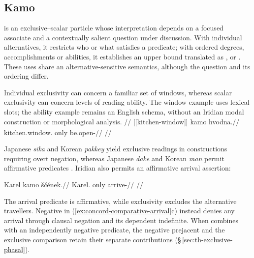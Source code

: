 \subsection{Kamo}  is an exclusive--scalar particle whose
interpretation depends on a focused associate and a contextually salient
question under discussion. With individual alternatives, it restricts who or
what satisfies a predicate; with ordered degrees, accomplishments or abilities,
it establishes an upper bound translated as ,  or
. These uses share an alternative-sensitive semantics, although
the question and its ordering differ.

Individual exclusivity can concern a familiar set of windows, whereas
scalar exclusivity can concern levels of reading ability. The window
example uses lexical slots; the ability example remains an English schema,
without an Iridian modal construction or morphological analysis.
\pex\label{ex:kamo-household-alternatives}
\a
\begingl
\glpreamble {}//
\gla \textnormal{[[kitchen-window]]}\textsubscript{\Dir{}} kamo hvodna.//
\glb kitchen.window.\Dir{} only be.open-\Cont{}//
\glft {}//
\endgl
\a {}
\xe

Japanese \textit{sika} and Korean \textit{pakkey} yield exclusive
readings in constructions requiring overt negation, whereas Japanese
\textit{dake} and Korean \textit{man} permit affirmative predicates
\cite[§\,3.1, examples~14--15]{sells2022}. Iridian  also
permits an affirmative arrival assertion:

\ex\label{ex:kamo-arrival-counterpart}%
\begingl
\gla Karel kamo ščének.//
\glb Karel.\Dir{} only arrive-\Pf{}//
\glft {}
//
\endgl
\xe

The arrival predicate is affirmative, while exclusivity excludes the
alternative travellers. Negative  in
(\ref{ex:concord-comparative-arrival}c) instead denies any arrival through
clausal negation and its dependent indefinite. When  combines
with an independently negative predicate, the negative prejacent and the
exclusive comparison retain their separate contributions
(§\,\ref{sec:th-exclusive-phasal}).


